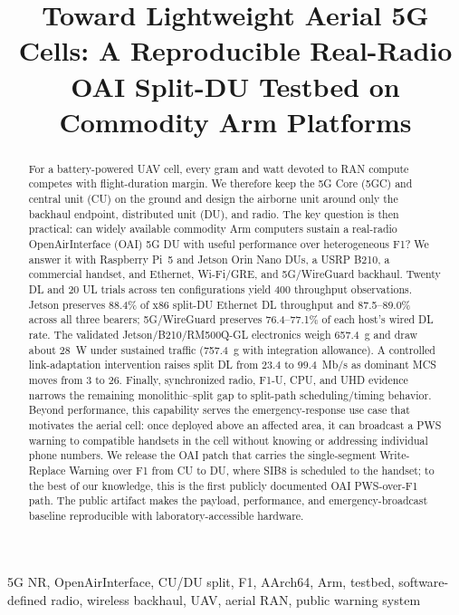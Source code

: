 \documentclass[conference]{IEEEtran}
\title{Toward Lightweight Aerial 5G Cells: A Reproducible Real-Radio OAI Split-DU Testbed on Commodity Arm Platforms}
\author{%
\IEEEauthorblockN{Marc DUBOC and Ammar El Falou}
\IEEEauthorblockA{King Abdullah University of Science and Technology (KAUST)\\
Thuwal, Saudi Arabia}}
\begin{document}
\maketitle

\begin{abstract}
For a battery-powered UAV cell, every gram and watt devoted to RAN compute
competes with flight-duration margin. We therefore keep the 5G Core (5GC) and
central unit (CU) on the ground and design the airborne unit around only the
backhaul endpoint, distributed unit (DU), and radio. The key question is then
practical: can widely available commodity Arm computers sustain a real-radio
OpenAirInterface (OAI) 5G DU with useful performance over heterogeneous F1?
We answer it with Raspberry Pi~5 and Jetson Orin Nano DUs, a USRP B210, a
commercial handset, and Ethernet, Wi-Fi/GRE, and 5G/WireGuard backhaul. Twenty
DL and 20 UL trials across ten configurations yield 400 throughput
observations. Jetson preserves 88.4\% of x86 split-DU Ethernet DL throughput
and 87.5--89.0\% across all three bearers; 5G/WireGuard preserves
76.4--77.1\% of each host's wired DL rate. The validated
Jetson/B210/RM500Q-GL electronics weigh 657.4~g and draw about 28~W under
sustained traffic (757.4~g with integration allowance). A controlled
link-adaptation intervention raises split DL from $23.4$ to
$99.4$~Mb/s as dominant MCS moves from 3 to 26. Finally, synchronized
radio, F1-U, CPU, and UHD evidence narrows the remaining monolithic--split gap
to split-path scheduling/timing behavior. Beyond performance, this capability serves the emergency-response use case
that motivates the aerial cell: once deployed above an affected area, it can
broadcast a PWS warning to compatible handsets in the cell without knowing or
addressing individual phone numbers. We release the OAI patch that carries the
single-segment Write-Replace Warning over F1 from CU to DU, where SIB8 is
scheduled to the handset; to the best of our knowledge, this is the first
publicly documented OAI PWS-over-F1 path. The public artifact makes the
payload, performance, and emergency-broadcast baseline reproducible with
laboratory-accessible hardware.
\end{abstract}

\begin{IEEEkeywords}
5G NR, OpenAirInterface, CU/DU split, F1, AArch64, Arm, testbed,
software-defined radio, wireless backhaul, UAV, aerial RAN, public warning system
\end{IEEEkeywords}
\end{document}

